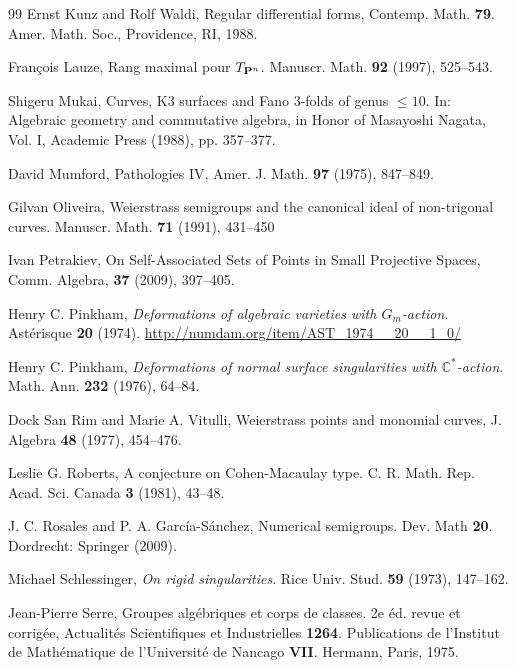 \documentclass{amsart}
\theoremstyle{definition}
\theoremstyle{remark}
\begin{document}
\begin{thebibliography}{99}
Ernst Kunz and Rolf Waldi,
Regular differential forms,
Contemp. Math. {\bf79}.
Amer. Math. Soc., Providence, RI, 1988.


François Lauze, Rang maximal pour $T_{{\bf P}^n} $. 
Manuscr. Math. {\bf 92} (1997), 525--543. \\

Shigeru Mukai, 
Curves, {K3} surfaces and {Fano} 3-folds of genus \(\leq 10\).
In: Algebraic geometry and commutative algebra, in {Honor} of {Masayoshi} {Nagata}, {Vol}. {I}, 
Academic Press (1988), pp. 357--377.


David Mumford, 
Pathologies IV, 
Amer. J. Math. {\bf 97} (1975), 847--849.

Gilvan Oliveira,
Weierstrass semigroups and the canonical ideal of non-trigonal curves.
 Manuscr. Math. {\bf71} (1991), 431--450 

Ivan Petrakiev, 
On Self-Associated Sets of Points in Small Projective Spaces, 
Comm. Algebra, {\bf37} (2009), 397--405. 

  Henry C. Pinkham,
  {\sl Deformations of algebraic varieties with
  $G_{m}$-action\/}.
  Ast\'erisque {\bf 20} (1974).
\url{http://numdam.org/item/AST_1974__20__1_0/}


  Henry C. Pinkham,
  {\sl Deformations of normal surface singularities with
  $\mathbb C^*$-action\/}.
  Math. Ann. {\bf 232} (1976), 64--84.

Dock San Rim and Marie A. Vitulli, 
Weierstrass points and monomial curves, 
J. Algebra {\bf48} (1977), 454--476. 

Leslie G. Roberts, 
A conjecture on {Cohen}-{Macaulay} type.
C. R. Math. Rep. Acad. Sci. Canada {\bf3} (1981), 43--48.

J. C. Rosales and P. A. García-Sánchez,
Numerical semigroups. 
Dev. Math {\bf20}.
Dordrecht: Springer (2009).

 Michael Schlessinger,
  {\sl On rigid singularities\/}.
   Rice Univ. Stud. {\bf 59} (1973), 147--162.


Jean-Pierre Serre,
Groupes algébriques et corps de classes. 2e éd. revue et corrigée,
Actualités Scientifiques et Industrielles {\bf1264}. Publications de l'Institut de Mathématique 
de l'Université de Nancago {\bf VII}. 
Hermann, Paris, 1975.



\end{thebibliography}
\end{document}
